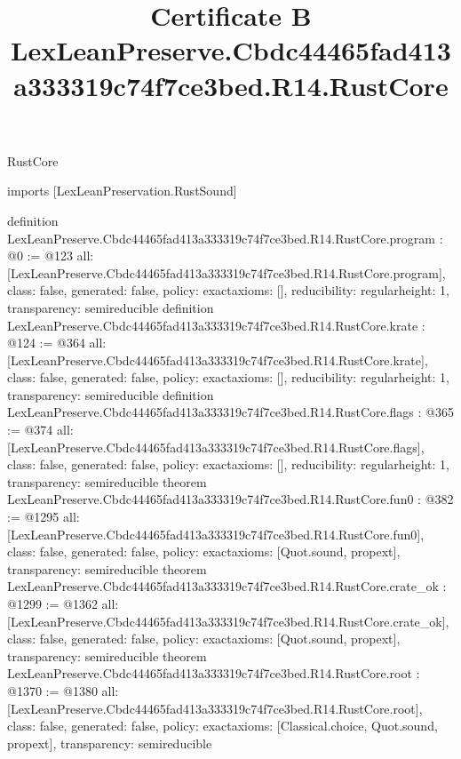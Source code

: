 \begin{lexlean}{RustCore}
\title{Certificate B LexLeanPreserve.Cbdc44465fad413a333319c74f7ce3bed.R14.RustCore}
\begin{coremodule}
imports [LexLeanPreservation.RustSound]

definition LexLeanPreserve.Cbdc44465fad413a333319c74f7ce3bed.R14.RustCore.program : @0 := @123 {
  all: [LexLeanPreserve.Cbdc44465fad413a333319c74f7ce3bed.R14.RustCore.program],
  class: false,
  generated: false,
  policy: exact{axioms: []},
  reducibility: regular{height: 1},
  transparency: semireducible
}
definition LexLeanPreserve.Cbdc44465fad413a333319c74f7ce3bed.R14.RustCore.krate : @124 := @364 {
  all: [LexLeanPreserve.Cbdc44465fad413a333319c74f7ce3bed.R14.RustCore.krate],
  class: false,
  generated: false,
  policy: exact{axioms: []},
  reducibility: regular{height: 1},
  transparency: semireducible
}
definition LexLeanPreserve.Cbdc44465fad413a333319c74f7ce3bed.R14.RustCore.flags : @365 := @374 {
  all: [LexLeanPreserve.Cbdc44465fad413a333319c74f7ce3bed.R14.RustCore.flags],
  class: false,
  generated: false,
  policy: exact{axioms: []},
  reducibility: regular{height: 1},
  transparency: semireducible
}
theorem LexLeanPreserve.Cbdc44465fad413a333319c74f7ce3bed.R14.RustCore.fun0 : @382 := @1295 {
  all: [LexLeanPreserve.Cbdc44465fad413a333319c74f7ce3bed.R14.RustCore.fun0],
  class: false,
  generated: false,
  policy: exact{axioms: [Quot.sound, propext]},
  transparency: semireducible
}
theorem LexLeanPreserve.Cbdc44465fad413a333319c74f7ce3bed.R14.RustCore.crate_ok : @1299 := @1362 {
  all: [LexLeanPreserve.Cbdc44465fad413a333319c74f7ce3bed.R14.RustCore.crate_ok],
  class: false,
  generated: false,
  policy: exact{axioms: [Quot.sound, propext]},
  transparency: semireducible
}
theorem LexLeanPreserve.Cbdc44465fad413a333319c74f7ce3bed.R14.RustCore.root : @1370 := @1380 {
  all: [LexLeanPreserve.Cbdc44465fad413a333319c74f7ce3bed.R14.RustCore.root],
  class: false,
  generated: false,
  policy: exact{axioms: [Classical.choice, Quot.sound, propext]},
  transparency: semireducible
}


\end{coremodule}
\end{lexlean}
